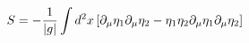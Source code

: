 \begin{equation}
    S=-{1\over |g|}\int d^2
   x\left[\partial_{\mu}\eta_{1}\partial_{\mu}\eta_{2}-\eta_{1}\eta_{2}
    \partial_{\mu}\eta_{1}\partial_{\mu}\eta_{2}\right]
    \end{equation}

